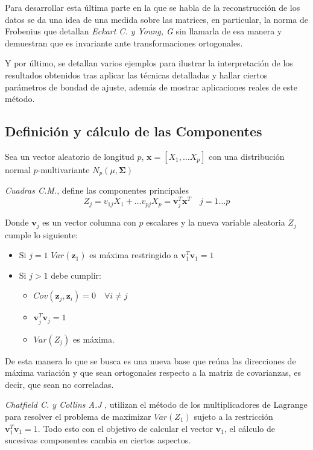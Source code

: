 \noindent Para desarrollar esta última parte en la que se habla de la reconstrucción de los datos se da una idea de una medida sobre las matrices, en particular, la norma de Frobenius que detallan \emph{Eckart C. y Young, G }\cite{Eckart 1936} sin llamarla de esa manera y demuestran que es invariante ante transformaciones ortogonales.

\noindent Y por último, se detallan varios ejemplos para ilustrar la interpretación de los resultados obtenidos tras aplicar las técnicas detalladas y hallar ciertos parámetros de bondad de ajuste, además de mostrar  aplicaciones reales de este método. 

\newpage
\subsection{Definición y cálculo de las Componentes}

\noindent Sea un vector aleatorio de longitud $p$, $\mathbf{x}=[X_1,\ldots X_p]$ con una distribución normal $p$-multivariante $N_p(\mu,\mathbf{\Sigma})$
\begin{defi}
\emph{Cuadras C.M.},\cite{Cuadras 2014} define las componentes principales 
\begin{equation}
Z_j=v_{1j}X_1+\ldots v_{pj}X_p=\mathbf{v}_j^T\mathbf{x}^T \quad j=1\ldots p
\end{equation}

\noindent Donde $\textbf{v}_j$ es un vector columna con $p$ escalares y la nueva variable aleatoria $Z_j$ cumple lo siguiente:
\begin{itemize}
\item Si $j=1$ $Var(\mathbf{z}_1)$ es máxima restringido a $\mathbf{v}_1^T \mathbf{v}_1=1$
\item Si $j>1$ debe cumplir:
\begin{itemize}
\item $Cov(\textbf{z}_j,\textbf{z}_i)=0\quad \forall i\neq j $
\item $\textbf{v}_j^T \textbf{v}_j=1$
\item $Var(Z_j)$ es máxima. 
\end{itemize}
\end{itemize}
\noindent De esta manera lo que se busca es una nueva base que reúna las direcciones de máxima variación y que sean ortogonales respecto a la matriz de covarianzas, es decir, que sean no correladas.
\end{defi}

\noindent \emph{Chatfield C. y Collins A.J} \cite{Chatfield 1989}, utilizan el método de los multiplicadores de Lagrange para resolver el problema de maximizar  $Var(Z_1)$ sujeto a la restricción $\textbf{v}_1^T\textbf{v}_1=1$. Todo esto con el objetivo de calcular el vector $\mathbf{v}_1$, el cálculo de sucesivas componentes cambia en ciertos aspectos. 

